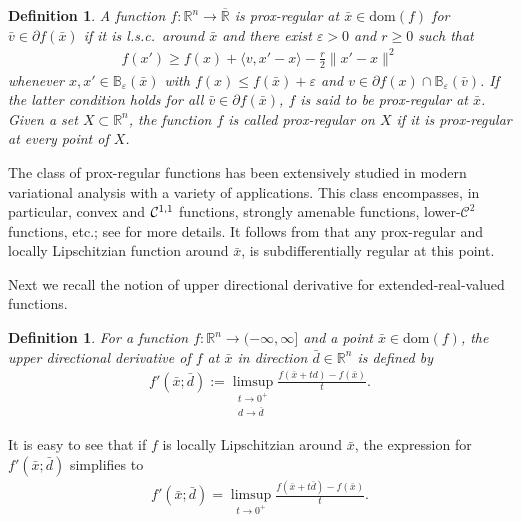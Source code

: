 \documentclass[11pt,a4paper]{article}
\def\Bar{\overline}
\newtheorem{definition}[theorem]{Definition}
\theoremstyle{plain}
\begin{document}
\begin{definition}\label{definition prox-regular}
A function $f:\mathbb{R}^n\to\Bar{\mathbb{R}}$ is {\em prox-regular} at $\bar x \in \text{dom}(f)$ for $\bar v \in \partial f(\bar x)$ if it is l.s.c.\ around $\bar x$ and there exist $\varepsilon > 0$ and $r \geq 0$ such that
\begin{equation*}
\begin{aligned}
f(x') \geq f(x) + \langle v, x' - x \rangle - \frac{r}{2} \|x' - x\|^2
\end{aligned}
\end{equation*}
whenever $x, x' \in \mathbb{B}_\varepsilon(\bar x)$ with $f(x) \leq f(\bar x) + \varepsilon$ and $v \in \partial f(x) \cap \mathbb{B}_\varepsilon(\bar v)$. If the latter condition holds for all $\bar v \in \partial f(\bar x)$, $f$ is said to be prox-regular at $\bar x$. Given a set $X \subset \mathbb{R}^n$, the function $f$ is called  prox-regular on $X$ if it is prox-regular at every point of $X$.   
\end{definition}

The class of prox-regular functions has been extensively studied in modern variational analysis with a variety of applications. This class encompasses, in particular, convex and ${\cal C}^{1,1}$ functions, strongly amenable functions, lower-$\mathcal{C}^2$ functions, etc.; see \cite{rockafellar1998variational} for more details. It follows from \cite[Theorem 5.2]{Clarke1995} that any prox-regular and locally Lipschitzian function around $\bar x$, is subdifferentially regular at this point.\vspace*{0.05in}

Next we recall the notion of upper directional derivative for extended-real-valued functions.

\begin{definition}\label{definition upper directional derivative}
For a function $f:\mathbb{R}^n\to (-\infty,\infty ]$ and a point $\bar x\in\text{dom}(f)$, the {\em upper directional derivative} of $f$ at $\bar x$ in direction $\bar d\in\mathbb{R}^n$ is defined by
\begin{equation*}
\begin{aligned}
f'(\bar x;\bar d):=\limsup\limits_{\substack{t\to0^+\\d\to\bar d}}\frac{f(\bar x+td)-f(\bar x)}{t}.
\end{aligned}
\end{equation*}
\end{definition}
It is easy to see that if $f$ is locally Lipschitzian around $\bar x$, the expression for $f'(\bar x;\bar d)$ simplifies to
\begin{equation}
\begin{aligned}\label{dirder}
f'(\bar x;\bar d)=\limsup\limits_{t\to0^+}\frac{f(\bar x+t\bar d)-f(\bar x)}{t}.
\end{aligned}
\end{equation}
\end{document}
